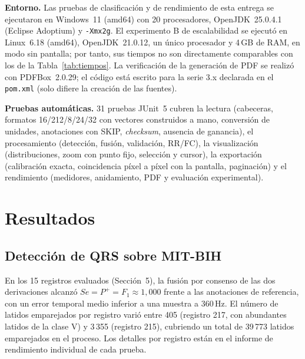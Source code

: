 \textbf{Entorno.} Las pruebas de clasificación y de rendimiento de esta
entrega se ejecutaron en Windows~11 (amd64) con 20 procesadores,
OpenJDK~25.0.4.1 (Eclipse Adoptium) y \texttt{-Xmx2g}. El experimento B
de escalabilidad se ejecutó en Linux~6.18 (amd64), OpenJDK~21.0.12, un
único procesador y 4\,GB de RAM, en modo sin pantalla; por tanto, sus
tiempos no son directamente comparables con los de la
Tabla~\ref{tab:tiempos}. La verificación de la generación de PDF se
realizó con PDFBox~2.0.29; el código está escrito para la serie 3.x
declarada en el \texttt{pom.xml} (solo difiere la creación de las
fuentes).

\textbf{Pruebas automáticas.} 31 pruebas JUnit~5 cubren la lectura
(cabeceras, formatos 16/212/8/24/32 con vectores construidos a mano,
conversión de unidades, anotaciones con SKIP, \emph{checksum}, ausencia
de ganancia), el procesamiento (detección, fusión, validación, RR/FC),
la visualización (distribuciones, zoom con punto fijo, selección y
cursor), la exportación (calibración exacta, coincidencia píxel a píxel
con la pantalla, paginación) y el rendimiento (medidores, anidamiento,
PDF y evaluación experimental).

\section{Resultados}

\subsection{Detección de QRS sobre MIT-BIH}
En los 15 registros evaluados (Sección~5), la fusión por consenso de las
dos derivaciones alcanzó $Se=P^{+}=F_1\approx 1{,}000$ frente a las
anotaciones de referencia, con un error temporal medio inferior a una
muestra a 360\,Hz. El número de latidos emparejados por registro varió
entre 405 (registro 217, con abundantes latidos de la clase V) y 3\,355
(registro 215), cubriendo un total de 39\,773 latidos emparejados en el proceso. Los detalles por registro están en el informe de rendimiento
individual de cada prueba.

